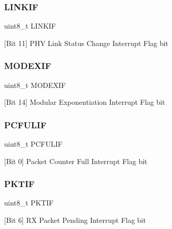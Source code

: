 \subsubsection{\texorpdfstring{LINKIF}{LINKIF}}
{\footnotesize\ttfamily uint8\+\_\+t L\+I\+N\+K\+IF}



\mbox{[}Bit 11\mbox{]} P\+HY Link Status Change Interrupt Flag bit 

\mbox{\label{structinterrupt_flags___ad01e267d93eace1bc14b2e98c7a6e23b}} 
\subsubsection{\texorpdfstring{MODEXIF}{MODEXIF}}
{\footnotesize\ttfamily uint8\+\_\+t M\+O\+D\+E\+X\+IF}



\mbox{[}Bit 14\mbox{]} Modular Exponentiation Interrupt Flag bit 

\mbox{\label{structinterrupt_flags___a54ca36edd15d3a43ea58c44c9b4632d1}} 
\subsubsection{\texorpdfstring{PCFULIF}{PCFULIF}}
{\footnotesize\ttfamily uint8\+\_\+t P\+C\+F\+U\+L\+IF}



\mbox{[}Bit 0\mbox{]} Packet Counter Full Interrupt Flag bit 

\mbox{\label{structinterrupt_flags___a4bfff8bb603cb3baf42fabe79d5e0a39}} 
\subsubsection{\texorpdfstring{PKTIF}{PKTIF}}
{\footnotesize\ttfamily uint8\+\_\+t P\+K\+T\+IF}



\mbox{[}Bit 6\mbox{]} RX Packet Pending Interrupt Flag bit 

